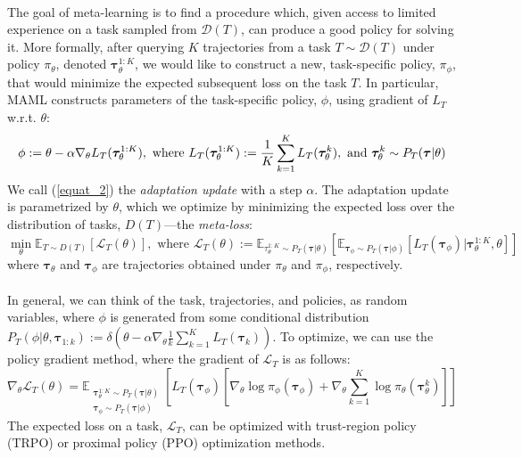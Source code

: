 \documentclass[12pt,a4paper]{article}
\begin{document}
\paragraph{}The goal of meta-learning is to find a procedure which, given access to limited experience on a task sampled from $\mathcal{D}(T)$, can produce a good policy for solving it. More formally, after querying $K$ trajectories from a task $T \sim \mathcal{D}(T)$ under policy $\pi_{\theta}$, denoted $\bm{\tau}_{\theta}^{1:K}$, we would like to construct a new, task-specific policy, $\pi_{\phi}$, that would minimize the expected subsequent loss on the task $T$. In particular, MAML constructs parameters of the task-specific policy, $\phi$, using gradient of $L_T$ w.r.t. $\theta$:
\begin{equation}
\label{equat_2}
\phi := \theta - \alpha \nabla_{\theta}L_T(\bm{\tau}_{\theta}^{1:K}), \textnormal{ where } L_T(\bm{\tau}_{\theta}^{1:K}) := \frac{1}{K}\sum\limits_{k=1}^{K}L_T(\bm{\tau}_{\theta}^{k}), \textnormal{ and } \bm{\tau}_{\theta}^{k} \sim P_T(\bm{\tau}|\theta)
\end{equation}
We call (\ref{equat_2}) the \textit{adaptation update} with a step $\alpha$. The adaptation update is parametrized by $\theta$, which we optimize by minimizing the expected loss over the distribution of tasks, $D(T)$---the \textit{meta-loss}:
\begin{equation}
\label{equat_3}
\min\limits_{\theta}\mathbb{E}_{T \sim D(T)}[\mathcal{L}_T(\theta)], \text{ where } \mathcal{L}_{T}(\theta) := \mathbb{E}_{\tau_{\theta}^{1:K} \sim P_T(\bm{\tau}|\theta)}[\mathbb{E}_{\bm{\tau}_{\phi} \sim P_{T}(\bm{\tau}|\phi)}[L_T(\bm{\tau}_{\phi})|\bm{\tau}_{\theta}^{1:K}, \theta]]
\end{equation}
where $\bm{\tau}_{\theta}$ and $\bm{\tau}_{\phi}$ are trajectories obtained under $\pi_{\theta}$ and $\pi_{\phi}$, respectively.
\paragraph{}In general, we can think of the task, trajectories, and policies, as random variables, where $\phi$ is generated from some conditional distribution $P_T(\phi|\theta, \bm{\tau}_{1:k}) := \delta(\theta - \alpha\nabla_{\theta}\frac{1}{k}\sum_{k=1}^{K}L_T(\bm{\tau}_k))$. To optimize, we can use the policy gradient method, where the gradient of $\mathcal{L}_T$ is as follows:
\begin{equation}
\label{equat_4}
\nabla_{\theta}\mathcal{L}_{T}(\theta) = \mathbb{E}_{\begin{array}{l}
\bm{\tau}_{\theta}^{1:K} \sim P_T(\bm{\tau}|\theta)\\ \bm{\tau}_{\phi} \sim P_T(\bm{\tau}|\phi)
\end{array}}\left[L_{T}(\bm{\tau}_{\phi})\left[\nabla_{\theta}\log \pi_{\phi}(\bm{\tau}_{\phi}) + \nabla_{\theta}\sum\limits_{k=1}^{K}\log\pi_{\theta}(\bm{\tau}_{\theta}^k) \right] \right]
\end{equation}
The expected loss on a task, $\mathcal{L}_T$, can be optimized with trust-region policy (TRPO) or proximal policy (PPO) optimization methods.
\end{document}
